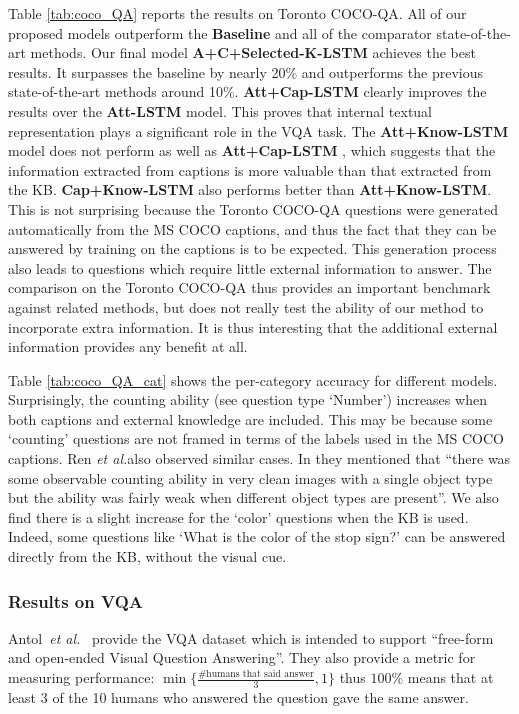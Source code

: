 \documentclass[10pt,journal,compsoc]{IEEEtran}
\newcommand{\etal}{\emph{et al.}}
\begin{document}
Table \ref{tab:coco_QA} reports the results on Toronto COCO-QA. All of our proposed models outperform the \textbf{Baseline} and all of the comparator state-of-the-art methods. Our final model \textbf{A+C+Selected-K-LSTM} achieves the best results. It surpasses the baseline by nearly 20\% and outperforms the previous state-of-the-art methods around 10\%. \textbf{Att+Cap-LSTM} clearly improves the results over the \textbf{Att-LSTM} model. This proves that internal textual representation plays a significant role in the VQA task. The \textbf{Att+Know-LSTM} model does not perform as well as \textbf{Att+Cap-LSTM} , which suggests that the information extracted from captions is more valuable than that extracted from the KB.  \textbf{Cap+Know-LSTM} also performs better than \textbf{Att+Know-LSTM}. This is not surprising because the Toronto COCO-QA questions were generated automatically from the MS COCO captions, and thus the fact that they can be answered by training on the captions is to be expected.  This generation process also leads to questions which require little external information to answer. The comparison on the Toronto COCO-QA thus provides an important benchmark against related methods, but does not really test the ability of our method to incorporate extra information.  It is thus interesting that the additional external information provides any benefit at all.

Table \ref{tab:coco_QA_cat} shows the per-category accuracy for different models. Surprisingly, the counting ability (see question type `Number') increases when both captions and external knowledge are included. This may be because some `counting' questions are not framed in terms of the labels used in the MS COCO captions. Ren \etal also observed similar cases. In \cite{ren2015image} they mentioned that ``there was some observable counting ability in very clean images with a single object type but the ability was fairly weak when different object types are present''. We also find there is a slight increase for the `color' questions when the KB is used. Indeed, some questions like `What is the color of the stop sign?' can be answered directly from the KB, without the visual cue. 

\subsubsection{Results on VQA}
Antol~\etal~\cite{antol2015vqa} provide the VQA dataset which is intended to support ``free-form and open-ended Visual Question Answering''. They also provide a metric for measuring performance: $\min\{\frac{\text{\# humans that said answer}}{3},1\}$ thus $100\%$ means that at least 3 of the 10 humans who answered the question gave the same answer. 
\end{document}
